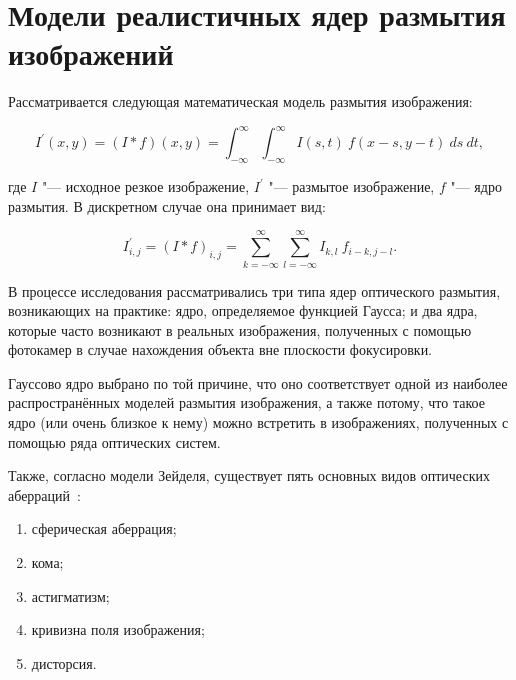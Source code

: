 \section{Модели реалистичных ядер размытия изображений}


Рассматривается следующая математическая модель размытия изображения:

\begin{equation*}
	I^\prime \left(x, y\right) = \left(I \ast f\right) \left(x, y\right) = \int_{-\infty}^{\infty}\int_{-\infty}^{\infty}{I\left(s,t\right)\ f\left(x-s,y-t\right)\ ds\ dt},
\end{equation*}

\noindent где $I$ "--- исходное резкое изображение, $I^\prime$ "--- размытое изображение, $f$ "--- ядро размытия. В дискретном случае она принимает вид:

\begin{equation*}
	I^\prime_{i,j} = \left(I \ast f\right)_{i,j} = \sum_{k=-\infty}^{\infty} \sum_{l=-\infty}^{\infty}{I_{k,l}\ f_{i-k,j-l}}.
\end{equation*}

В процессе исследования рассматривались три типа ядер оптического размытия, возникающих на практике: ядро, определяемое функцией Гаусса; и два ядра, которые часто возникают в реальных изображения, полученных с помощью фотокамер в случае нахождения объекта вне плоскости фокусировки.

Гауссово ядро выбрано по той причине, что оно соответствует одной из наиболее распространённых моделей размытия изображения, а также потому, что такое ядро (или очень близкое к нему) можно встретить в изображениях, полученных с помощью ряда оптических систем.

Также, согласно модели Зейделя, существует пять основных видов оптических аберраций~\cite{simpkins2014parameterized}:
\begin{enumerate}[beginpenalty=10000]
	\item сферическая аберрация;
	\item кома;
	\item астигматизм;
	\item кривизна поля изображения;
	\item дисторсия.
\end{enumerate}

